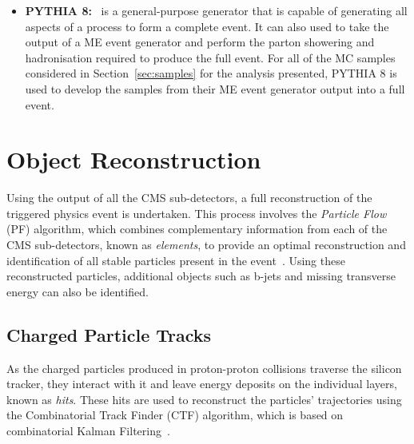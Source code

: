 \begin{itemize}
%


\item \textbf{PYTHIA 8:}~\cite{Sjostrand:2014zea} is a general-purpose generator that is capable of generating all aspects of a process to form a complete event.
It can also used to take the output of a ME event generator and perform the parton showering and hadronisation required to produce the full event. For all of the MC samples considered in Section~\ref{sec:samples} for the analysis presented, PYTHIA 8 is used to develop the samples from their ME event generator output into a full event.
\end{itemize}

\section{Object Reconstruction}\label{sec:reco}
Using the output of all the CMS sub-detectors, a full reconstruction of the triggered physics event is undertaken.
This process involves the \emph{Particle Flow} (PF) algorithm, which combines complementary information from each of the CMS sub-detectors, known as \emph{elements}, to provide an optimal reconstruction and identification of all stable particles present in the event~\cite{CMS:2009nxa,CMS:2010eua,CMS-PRF-14-001}.
Using these reconstructed particles, additional objects such as b-jets and missing transverse energy can also be identified.

\subsection{Charged Particle Tracks}\label{subsec:tracks}
As the charged particles produced in proton-proton collisions traverse the silicon tracker, they interact with it and leave energy deposits on the individual layers, known as \emph{hits}.
These hits are used to reconstruct the particles' trajectories using the Combinatorial Track Finder (CTF) algorithm, which is based on combinatorial Kalman Filtering~\cite{Chatrchyan:2014fea,Fruhwirth:1987fm}.

